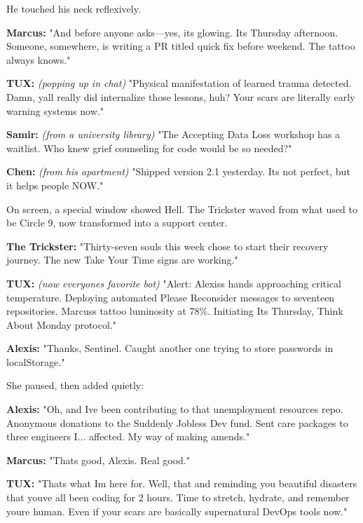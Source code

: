 He touched his neck reflexively.

\textbf{Marcus:} "And before anyone asks---yes, it\textquotesingle s glowing. It\textquotesingle s Thursday afternoon. Someone, somewhere, is writing a PR titled \textquotesingle quick fix before weekend.\textquotesingle{} The tattoo always knows."

\textbf{TUX:} \emph{(popping up in chat)} "Physical manifestation of learned trauma detected. Damn, y\textquotesingle all really did internalize those lessons, huh? Your scars are literally early warning systems now."

\textbf{Samir:} \emph{(from a university library)} "The \textquotesingle Accepting Data Loss\textquotesingle{} workshop has a waitlist. Who knew grief counseling for code would be so needed?"

\textbf{Chen:} \emph{(from his apartment)} "Shipped version 2.1 yesterday. It\textquotesingle s not perfect, but it helps people NOW."

On screen, a special window showed Hell. The Trickster waved from what used to be Circle 9, now transformed into a support center.

\textbf{The Trickster:} "Thirty-seven souls this week chose to start their recovery journey. The new \textquotesingle Take Your Time\textquotesingle{} signs are working."

\textbf{TUX:} \emph{(now everyone\textquotesingle s favorite bot)} "Alert: Alexis\textquotesingle s hands approaching critical temperature. Deploying automated \textquotesingle Please Reconsider\textquotesingle{} messages to seventeen repositories. Marcus\textquotesingle s tattoo luminosity at 78\%. Initiating \textquotesingle It\textquotesingle s Thursday, Think About Monday\textquotesingle{} protocol."

\textbf{Alexis:} "Thanks, Sentinel. Caught another one trying to store passwords in localStorage."

She paused, then added quietly:

\textbf{Alexis:} "Oh, and I\textquotesingle ve been contributing to that unemployment resources repo. Anonymous donations to the \textquotesingle Suddenly Jobless Dev\textquotesingle{} fund. Sent care packages to three engineers I... affected. My way of making amends."

\textbf{Marcus:} "That\textquotesingle s good, Alexis. Real good."

\textbf{TUX:} "That\textquotesingle s what I\textquotesingle m here for. Well, that and reminding you beautiful disasters that you\textquotesingle ve all been coding for 2 hours. Time to stretch, hydrate, and remember you\textquotesingle re human. Even if your scars are basically supernatural DevOps tools now."

